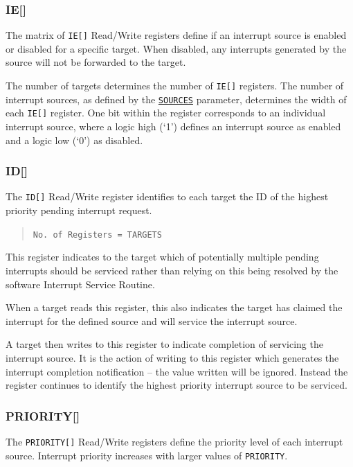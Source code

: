 \subsubsection{IE[]}

The matrix of \texttt{IE[]} Read/Write registers define if an interrupt source is enabled or disabled for a specific target.
When disabled, any interrupts generated by the source will not be forwarded to the target.

The number of targets determines the number of \texttt{IE[]} registers.
The number of interrupt sources, as defined by the \protect\hyperlink{SOURCES}{\texttt{SOURCES}} parameter, determines the width of each \texttt{IE[]} register.
One bit within the register corresponds to an individual interrupt source, where a logic high (`1') defines an interrupt source as enabled and a logic low (`0') as disabled.

\subsubsection{ID[]}

The \texttt{ID[]} Read/Write register identifies to each target the ID of the highest priority pending interrupt request.

\begin{quote}
	\texttt{No.\ of\ Registers\ =\ TARGETS}
\end{quote}

This register indicates to the target which of potentially multiple
pending interrupts should be serviced rather than relying on this being
resolved by the software Interrupt Service Routine.

When a target reads this register, this also indicates the target has
claimed the interrupt for the defined source and will service the interrupt source.

A target then writes to this register to indicate completion of servicing the interrupt source.
It is the action of writing to this register which generates the interrupt completion notification -- the
value written will be ignored. Instead the register continues to identify the highest priority interrupt source to be serviced.

\subsubsection{PRIORITY[]}

The \texttt{PRIORITY[]} Read/Write registers define the priority level of each interrupt source. Interrupt priority increases with larger values of \texttt{PRIORITY}.

